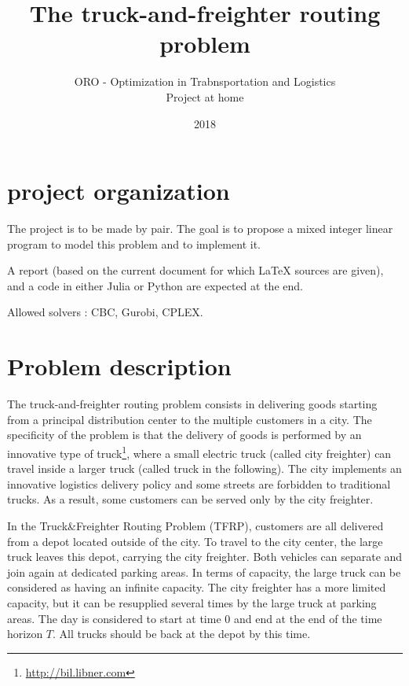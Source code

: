 \documentclass[dvipsnames,authoryear,11pt]{article}
\title{The truck-and-freighter routing problem}
\author{ORO - Optimization in Trabnsportation and Logistics \\
	Project at home }
\date{2018}
\begin{document}
	
	\maketitle

		

\section{project organization}

The project is to be made by pair. The goal is to propose a mixed integer linear program to model this problem and to implement it.

A report (based on the current document for which LaTeX sources are given), and a code in either Julia or Python are expected at the end. 

Allowed solvers : CBC, Gurobi, CPLEX.



\section{Problem description}

The truck-and-freighter routing problem consists in delivering goods starting from a principal distribution center to the multiple customers in a city. The specificity of the problem is that the delivery of goods is performed by an innovative type of truck\footnote{\url{http://bil.libner.com}}, where a small electric truck (called city freighter) can travel inside a larger truck (called truck in the following). The city implements an innovative logistics delivery policy and some streets are forbidden to traditional trucks. 
As a result, some customers can be served only by the city freighter. 

In the Truck\&Freighter Routing Problem (TFRP), customers are all delivered from a depot located outside of the city.
To travel to the city center, the large truck leaves this depot, carrying the city freighter. 
Both vehicles can separate and join again at dedicated parking areas. In terms of capacity, the large truck can be considered as having an infinite capacity. The city freighter has a more limited capacity, but it can be resupplied several times by the large truck at parking areas. The day is considered to start at time $0$ and end at the end of the time horizon $T$. All trucks should be back at the depot by this time.
\end{document}
